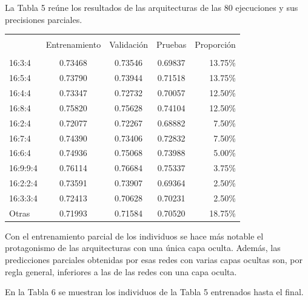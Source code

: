\documentclass[spanish,a4paper,12pt,twoside]{report}
\begin{document}
  La Tabla 5 reúne los resultados de las arquitecturas de las 80 ejecuciones y sus precisiones parciales.
\begin{center}
   \label{table}
  \begin{tabular}{l c c c r}
    \hline \\ [-2ex]
    & Entrenamiento & Validación & Pruebas & Proporción \\ [0.5ex]
    \hline \\ [-1ex]
    16:3:4 & 0.73468 & 0.73546 & 0.69837 & 13.75\% \\
    16:5:4 & 0.73790 & 0.73944 & 0.71518 & 13.75\% \\
    16:4:4 & 0.73347 & 0.72732 & 0.70057 & 12.50\% \\
    16:8:4 & 0.75820 & 0.75628 & 0.74104 & 12.50\% \\
    16:2:4 & 0.72077 & 0.72267 & 0.68882 & 7.50\% \\
    16:7:4 & 0.74390 & 0.73406 & 0.72832 & 7.50\% \\
    16:6:4 & 0.74936 & 0.75068 & 0.73988 & 5.00\% \\
    16:9:9:4 & 0.76114 & 0.76684 & 0.75337 & 3.75\% \\
    16:2:2:4 & 0.73591 & 0.73907 & 0.69364 & 2.50\% \\
    16:3:3:4 & 0.72413 & 0.70628 & 0.70231 & 2.50\%\\ 
    Otras & 0.71993 & 0.71584 & 0.70520 & 18.75\% \\ [1ex]
    \hline
  \end{tabular}
\end{center} \par
  Con el entrenamiento parcial de los individuos se hace más notable el protagonismo de las arquitecturas con una única capa oculta. Además, las predicciones parciales obtenidas por esas redes con varias capas ocultas son, por regla general, inferiores a las de las redes con una capa oculta. \par
  En la Tabla 6 se muestran los individuos de la Tabla 5 entrenados hasta el final.
\end{document}
